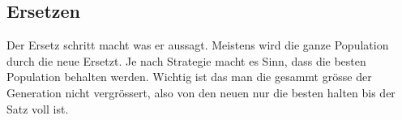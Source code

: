 %
%
%
%
\subsection{Ersetzen
\label{genetic_algorithm:replacement}}
Der Ersetz schritt macht was er aussagt. Meistens wird die ganze 
Population durch die neue Ersetzt. Je nach Strategie macht es Sinn, dass 
die besten Population behalten werden. Wichtig ist das man die gesammt 
grösse der Generation nicht vergrössert, also von den neuen nur die besten 
halten bis der Satz voll ist.

